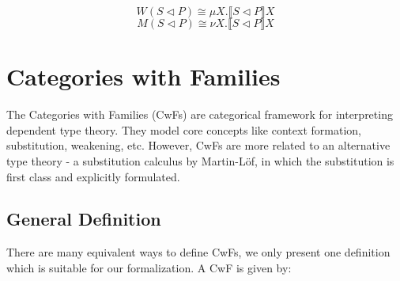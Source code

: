 \[ W(S \triangleleft P) \cong \mu X. \llbracket S \triangleleft P \rrbracket X \]
\[ M(S \triangleleft P) \cong \nu X. \llbracket S \triangleleft P \rrbracket X \]

\section{Categories with Families}

The Categories with Families (CwFs) are categorical framework for interpreting dependent type theory. They model core concepts like context formation, substitution, weakening, etc. However, CwFs are more related to an alternative type theory - a substitution calculus by Martin-Löf, in which the substitution is first class and explicitly formulated.

\subsection{General Definition}

There are many equivalent ways to define CwFs, we only present one definition which is suitable for our formalization. A CwF is given by:

